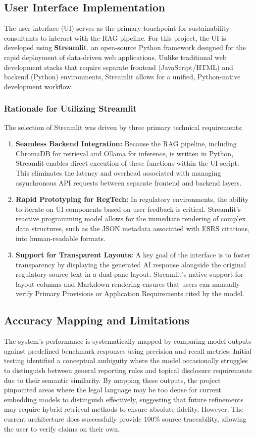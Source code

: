 \documentclass[12pt]{article}
\begin{document}
\subsection{User Interface Implementation}The user interface (UI) serves as the primary touchpoint for sustainability consultants to interact with the RAG pipeline. For this project, the UI is developed using \textbf{Streamlit}, an open-source Python framework designed for the rapid deployment of data-driven web applications. Unlike traditional web development stacks that require separate frontend (JavaScript/HTML) and backend (Python) environments, Streamlit allows for a unified, Python-native development workflow.\subsubsection{Rationale for Utilizing Streamlit}The selection of Streamlit was driven by three primary technical requirements:\begin{enumerate}
\item \textbf{Seamless Backend Integration:} Because the RAG pipeline, including ChromaDB for retrieval and Ollama for inference, is written in Python, Streamlit enables direct execution of these functions within the UI script. This eliminates the latency and overhead associated with managing asynchronous API requests between separate frontend and backend layers.
\item \textbf{Rapid Prototyping for RegTech:} In regulatory environments, the ability to iterate on UI components based on user feedback is critical. Streamlit's reactive programming model allows for the immediate rendering of complex data structures, such as the JSON metadata associated with ESRS citations, into human-readable formats.
\item \textbf{Support for Transparent Layouts:} A key goal of the interface is to foster transparency by displaying the generated AI response alongside the original regulatory source text in a dual-pane layout. Streamlit's native support for layout columns and Markdown rendering ensures that users can manually verify Primary Provisions or Application Requirements cited by the model.
\end{enumerate}

\subsection{Accuracy Mapping and Limitations}
The system's performance is systematically mapped by comparing model outputs against predefined benchmark responses using precision and recall metrics. Initial testing identified a conceptual ambiguity where the model occasionally struggles to distinguish between general reporting rules and topical disclosure requirements due to their semantic similarity. By mapping these outputs, the project pinpointed areas where the legal language may be too dense for current embedding models to distinguish effectively, suggesting that future refinements may require hybrid retrieval methods to ensure absolute fidelity. However, The current architecture does successfully provide 100\% source traceability, allowing the user to verify claims on their own. 
\end{document}
